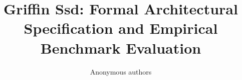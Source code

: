 \title{\textbf{Griffin Ssd: Formal Architectural Specification and Empirical Benchmark Evaluation}}

\author{Anonymous authors}
